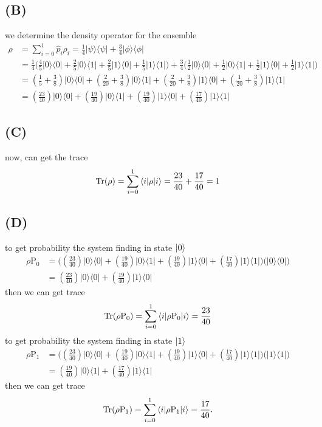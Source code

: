 \documentclass{article}
\newcommand{\op}[2]{|#1\rangle \langle#2|}
\newcommand{\sand}[3]{\braket{#1 | #2 | #3}}
\begin{document}
\subsection*{(B)}
we determine the density operator for the ensemble
\begin{align*}
   \rho &= \sum_{i=0}^{1} \hat{p}_{i} \rho_{i} =  \frac{1}{4}\op{\psi}{\psi} + \frac{3}{4}\op{\phi}{\phi} \\
   &= \frac{1}{4}\big(\frac{4}{5}\op{0}{0} + \frac{2}{5}\op{0}{1} + \frac{2}{5}\op{1}{0} + \frac{1}{5}\op{1}{1}\big) + \frac{3}{4}\big(\frac{1}{2}\op{0}{0} + \frac{1}{2}\op{0}{1} + \frac{1}{2}\op{1}{0} + \frac{1}{2}\op{1}{1}\big) \\
   &= (\frac{1}{5} + \frac{3}{8})\op{0}{0} + (\frac{2}{20} + \frac{3}{8})\op{0}{1} + (\frac{2}{20} + \frac{3}{8})\op{1}{0} + (\frac{1}{20} + \frac{3}{8})\op{1}{1} \\
   &= (\frac{23}{40})\op{0}{0} + (\frac{19}{40})\op{0}{1} + (\frac{19}{40})\op{1}{0} + (\frac{17}{40})\op{1}{1} 
\end{align*}
\subsection*{(C)}
now, can get the trace
\begin{align*}
   \text{Tr}(\rho) = \sum_{i=0}^{1} \sand{i}{\rho}{i} = \frac{23}{40} + \frac{17}{40} = 1
\end{align*}
\subsection*{(D)}
to get probability the system finding in state $\ket{0}$
\begin{align*}
   \rho\text{P}_{0} &= \big((\frac{23}{40})\op{0}{0} + (\frac{19}{40})\op{0}{1} + (\frac{19}{40})\op{1}{0} + (\frac{17}{40})\op{1}{1}\big)\big(\op{0}{0}\big) \\
   &= (\frac{23}{40})\op{0}{0} + (\frac{19}{40})\op{1}{0}
\end{align*}
then we can get trace 
\begin{align*}
   \text{Tr}(\rho\text{P}_{0}) = \sum_{i=0}^{1} \sand{i}{\rho\text{P}_{0}}{i} = \frac{23}{40}
\end{align*}
to get probability the system finding in state $\ket{1}$
\begin{align*}
   \rho\text{P}_{1} &= \big((\frac{23}{40})\op{0}{0} + (\frac{19}{40})\op{0}{1} + (\frac{19}{40})\op{1}{0} + (\frac{17}{40})\op{1}{1}\big)\big(\op{1}{1}\big) \\
   &= (\frac{19}{40})\op{0}{1} + (\frac{17}{40})\op{1}{1}
\end{align*}
then we can get trace 
\begin{align*}
   \text{Tr}(\rho\text{P}_{1}) = \sum_{i=0}^{1} \sand{i}{\rho\text{P}_{1}}{i} = \frac{17}{40}.
\end{align*}
\end{document}
